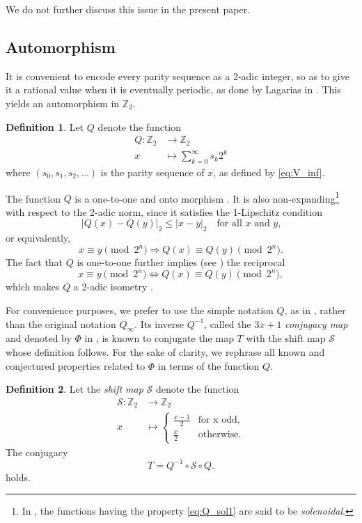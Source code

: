 \documentclass[12pt]{article}
\theoremstyle{definition}
\newtheorem{definition}{Definition}
\begin{document}
We do not further discuss this issue in the present paper.

\subsection{Automorphism}
It is convenient to encode every parity sequence as a 2-adic integer, so as to give it a rational value when it is eventually periodic, as done by Lagarias in \cite{Lag85}.  This yields an automorphism in $\mathbb Z_2$.

\begin{definition} \label{def:Q}
 Let $Q$ denote the  function 
$$ \begin{array}{rl}Q:  \mathbb Z_2 & \longrightarrow \mathbb Z_2\\
 x & \longmapsto \sum_{k=0}^{\infty} s_k 2^{k} \end{array}$$
 where $( s_0, s_1, s_2, \ldots )$ is the parity sequence of $x$, as defined by \eqref{eq:V_inf}.
\end{definition}

The function $Q$ is a one-to-one and onto morphism \cite{Ber96,Lag85}. It is also non-expanding\footnote{In \cite{Ber96}, the functions having the property \eqref{eq:Q_sol1} are said to be \textit{solenoidal}.} with respect to the 2-adic norm, since it satisfies the 1-Lipschitz condition 
$$|Q(x) - Q(y)|_{2} \leq |x - y|_{2} \quad \text{for all $x$ and $y$,}$$
or equivalently,
\begin{equation}\label{eq:Q_sol1}
x \equiv y \pmod{2^n} \Longrightarrow  Q(x) \equiv Q(y) \pmod{2^n}.
\end{equation}
The fact that $Q$ is one-to-one further implies (see \cite{Ana06}) the reciprocal
\begin{equation}\label{eq:Q_sol2}
x \equiv y \pmod{2^n} \Longleftrightarrow  Q(x) \equiv Q(y) \pmod{2^n},
\end{equation}
which makes $Q$ a 2-adic isometry \cite{Ber96}.

For convenience purposes, we prefer to use the simple notation $Q$, as in \cite{Aki04}, rather than the original notation $Q_{\infty}$. Its inverse $Q^{-1}$, called the $3x+1$ \textit{conjugacy map} and denoted by $\Phi$ in \cite{Ber96, Mon04}, is known \cite{Ber94} to conjugate the map $T$ with the shift map $\mathcal{S}$ whose definition follows. For the sake of clarity, we rephrase all known and conjectured properties related to $\Phi$ in terms of the function $Q$.
\begin{definition}
Let the {\em shift map} $\mathcal{S}$ denote the function 
$$ \begin{array}{rl}\mathcal{S}:  \mathbb Z_2 & \longrightarrow \mathbb Z_2\\
 x & \longmapsto \left\{\begin{array}{ll}
  \frac{x-1}{2} & \mbox{for x odd,} \\
  \frac{x}{2} & \mbox{otherwise.} 
\end{array}\right.
\end{array}$$
The conjugacy
\begin{equation} \label{eq:TS_conjug}
T = Q^{-1} \circ \mathcal{S} \circ Q.
\end{equation}
holds.
\end{definition}
 
\end{document}

